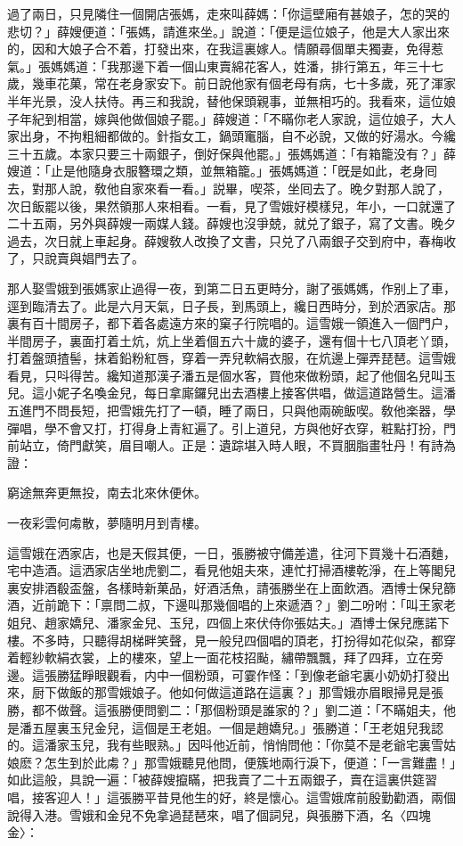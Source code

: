 過了兩日，只見隣住一個開店張媽，走來叫薛媽：「你這壁廂有甚娘子，怎的哭的悲切？」薛嫂便道：「張媽，請進來坐。」說道：「便是這位娘子，他是大人家出來的，因和大娘子合不着，打發出來，在我這裏嫁人。情願尋個單夫獨妻，免得惹氣。」張媽媽道：「我那邊下着一個山東賣綿花客人，姓潘，排行第五，年三十七歲，幾車花菓，常在老身家安下。前日說他家有個老母有病，七十多歲，死了渾家半年光景，没人扶侍。再三和我說，替他保頭親事，並無相巧的。我看來，這位娘子年紀到相當，嫁與他做個娘子罷。」薛嫂道：「不瞞你老人家說，這位娘子，大人家出身，不拘粗細都做的。針指女工，鍋頭竃腦，自不必說，又做的好湯水。今纔三十五歲。本家只要三十兩銀子，倒好保與他罷。」張媽媽道：「有箱籠没有？」薛嫂道：「止是他隨身衣服簪環之類，並無箱籠。」張媽媽道：「旣是如此，老身囘去，對那人說，敎他自家來看一看。」説畢，喫茶，坐囘去了。晚夕對那人說了，次日飯罷以後，果然領那人來相看。一看，見了雪娥好模樣兒，年小，一口就還了二十五兩，另外與薛嫂一兩媒人錢。薛嫂也沒爭兢，就兑了銀子，寫了文書。晚夕過去，次日就上車起身。薛嫂敎人改換了文書，只兑了八兩銀子交到府中，春梅收了，只說賣與娼門去了。

那人娶雪娥到張媽家止過得一夜，到第二日五更時分，謝了張媽媽，作别上了車，逕到臨清去了。此是六月天氣，日子長，到馬頭上，纔日西時分，到於洒家店。那裏有百十間房子，都下着各處遠方來的窠子行院唱的。這雪娥一領進入一個門户，半間房子，裏面打着土炕，炕上坐着個五六十歲的婆子，還有個十七八頂老丫頭，打着盤頭揸髻，抹着鉛粉紅唇，穿着一弄兒軟絹衣服，在炕邊上彈弄琵琶。這雪娥看見，只呌得苦。纔知道那漢子潘五是個水客，買他來做粉頭，起了他個名兒叫玉兒。這小妮子名喚金兒，每日拿廝鑼兒出去酒樓上接客供唱，做這道路營生。這潘五進門不問長短，把雪娥先打了一頓，睡了兩日，只與他兩碗飯喫。敎他楽器，學彈唱，學不會又打，打得身上青紅遍了。引上道兒，方與他好衣穿，粧點打扮，門前站立，倚門獻笑，眉目嘲人。正是：遺踪堪入時人眼，不買胭脂畫牡丹！有詩為證：

\begin{myquote}
窮途無奔更無投，南去北來休便休。

一夜彩雲何䖏散，夢隨明月到青樓。
\end{myquote}

這雪娥在洒家店，也是天假其便，一日，張勝被守備差遣，往河下買幾十石酒麯，宅中造酒。這洒家店坐地虎劉二，看見他姐夫來，連忙打掃酒樓乾淨，在上等閣兒裏安排酒殽盃盤，各樣時新菓品，好酒活魚，請張勝坐在上面飲酒。酒博士保兒篩酒，近前跪下：「禀問二叔，下邊叫那幾個唱的上來遞酒？」劉二吩咐：「叫王家老姐兒、趙家嬌兒、潘家金兒、玉兒，四個上來伏侍你張姑夫。」酒博士保兒應諾下樓。不多時，只聽得胡梯畔笑聲，見一般兒四個唱的頂老，打扮得如花似朶，都穿着輕紗軟絹衣裳，上的樓來，望上一面花枝招颭，繡帶飄飄，拜了四拜，立在旁邊。這張勝猛睜眼觀看，内中一個粉頭，可霎作怪：「到像老爺宅裏小奶奶打發出來，厨下做飯的那雪娥娘子。他如何做這道路在這裏？」那雪娥亦眉眼掃見是張勝，都不做聲。這張勝便問劉二：「那個粉頭是誰家的？」劉二道：「不瞞姐夫，他是潘五屋裏玉兒金兒，這個是王老姐。一個是趙嬌兒。」張勝道：「王老姐兒我認的。這潘家玉兒，我有些眼熟。」因呌他近前，悄悄問他：「你莫不是老爺宅裏雪姑娘麽？怎生到於此䖏？」那雪娥聽見他問，便簇地兩行淚下，便道：「一言難盡！」如此這般，具說一遍：「被薛嫂攛瞞，把我賣了二十五兩銀子，賣在這裏供筵習唱，接客迎人！」這張勝平昔見他生的好，終是懷心。這雪娥席前殷勤勸酒，兩個說得入港。雪娥和金兒不免拿過琵琶來，唱了個詞兒，與張勝下酒，名〈四塊金〉：

